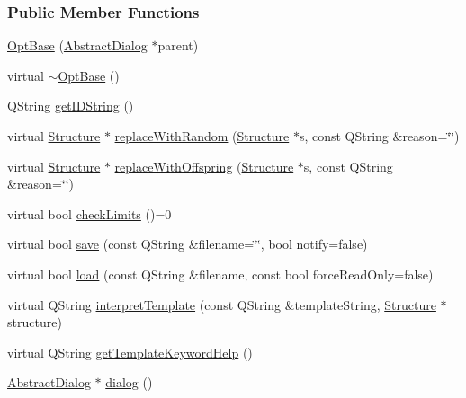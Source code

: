 \subsubsection*{Public Member Functions}
\begin{DoxyCompactItemize}
\item 
\hyperlink{classGlobalSearch_1_1OptBase_a673110fb0bfe11da3f9f7811744c6578}{Opt\+Base} (\hyperlink{classGlobalSearch_1_1AbstractDialog}{Abstract\+Dialog} $\ast$parent)
\item 
virtual \hyperlink{classGlobalSearch_1_1OptBase_a8b5809d4bb0f97a2bad0ffc05c161f86}{$\sim$\+Opt\+Base} ()
\item 
Q\+String \hyperlink{classGlobalSearch_1_1OptBase_ae4223191dd58c47e186bbdf07f99ef1c}{get\+I\+D\+String} ()
\item 
virtual \hyperlink{classGlobalSearch_1_1Structure}{Structure} $\ast$ \hyperlink{classGlobalSearch_1_1OptBase_a8a370fdd83d4a157bb72fb0c865e31a4}{replace\+With\+Random} (\hyperlink{classGlobalSearch_1_1Structure}{Structure} $\ast$s, const Q\+String \&reason=\char`\"{}\char`\"{})
\item 
virtual \hyperlink{classGlobalSearch_1_1Structure}{Structure} $\ast$ \hyperlink{classGlobalSearch_1_1OptBase_a95ca1cb22a947989817c7cfc952cffbd}{replace\+With\+Offspring} (\hyperlink{classGlobalSearch_1_1Structure}{Structure} $\ast$s, const Q\+String \&reason=\char`\"{}\char`\"{})
\item 
virtual bool \hyperlink{classGlobalSearch_1_1OptBase_a406ca6399df3ef7fa545f3b34f90e0a4}{check\+Limits} ()=0
\item 
virtual bool \hyperlink{classGlobalSearch_1_1OptBase_abfacbe5ffa9d69db4e27bf6db2ad62f7}{save} (const Q\+String \&filename=\char`\"{}\char`\"{}, bool notify=false)
\item 
virtual bool \hyperlink{classGlobalSearch_1_1OptBase_a1d5e689eb327ccaf4c25f64e83e5678b}{load} (const Q\+String \&filename, const bool force\+Read\+Only=false)
\item 
virtual Q\+String \hyperlink{classGlobalSearch_1_1OptBase_a238dbb50b8d7aac7a6660613397565f0}{interpret\+Template} (const Q\+String \&template\+String, \hyperlink{classGlobalSearch_1_1Structure}{Structure} $\ast$structure)
\item 
virtual Q\+String \hyperlink{classGlobalSearch_1_1OptBase_a79650b4bd0dde4580a98a89e7032be96}{get\+Template\+Keyword\+Help} ()
\item 
\hyperlink{classGlobalSearch_1_1AbstractDialog}{Abstract\+Dialog} $\ast$ \hyperlink{classGlobalSearch_1_1OptBase_a3ccbd5949beb6e1efac734da29b726b7}{dialog} ()

\end{DoxyCompactItemize}
